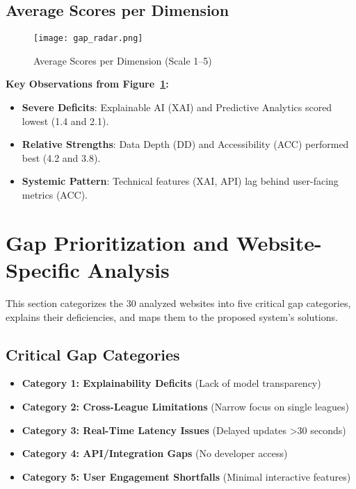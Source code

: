 \subsection{Average Scores per Dimension}
\begin{figure}[h!]
    \centering
    \texttt{[image: gap\_radar.png]}
    \caption{Average Scores per Dimension (Scale 1–5)}
    \label{fig:gap-radar}
\end{figure}
\textbf{Key Observations from Figure~\ref{fig:gap-radar}:}
\begin{itemize}
    \item \textbf{Severe Deficits}: Explainable AI (XAI) and Predictive Analytics scored lowest (1.4 and 2.1).
    \item \textbf{Relative Strengths}: Data Depth (DD) and Accessibility (ACC) performed best (4.2 and 3.8).
    \item \textbf{Systemic Pattern}: Technical features (XAI, API) lag behind user-facing metrics (ACC).
\end{itemize}

\section{Gap Prioritization and Website-Specific Analysis}
This section categorizes the 30 analyzed websites into five critical gap categories, explains their deficiencies, and maps them to the proposed system’s solutions.

\subsection{Critical Gap Categories}
\begin{itemize}
\item \textbf{Category 1: Explainability Deficits} (Lack of model transparency)
\item \textbf{Category 2: Cross-League Limitations} (Narrow focus on single leagues)
\item \textbf{Category 3: Real-Time Latency Issues} (Delayed updates >30 seconds)
\item \textbf{Category 4: API/Integration Gaps} (No developer access)
\item \textbf{Category 5: User Engagement Shortfalls} (Minimal interactive features)
\end{itemize}

